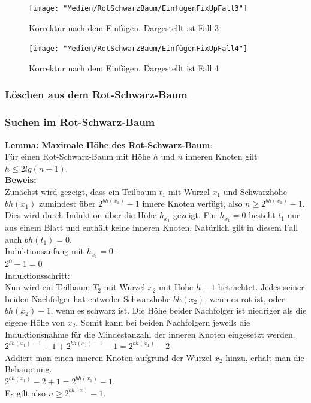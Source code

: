 \documentclass[a4paper,12pt]{article}
\begin{document}
\begin{figure}[h]
	\centering
	\texttt{[image: "Medien/RotSchwarzBaum/EinfügenFixUpFall3"]}
	\caption{Korrektur nach dem Einfügen. Dargestellt ist Fall 3  }
	\label{fig:EinfügenFixUpFall3}
\end{figure}

\begin{figure}[h]
	\centering
	\texttt{[image: "Medien/RotSchwarzBaum/EinfügenFixUpFall4"]}
	\caption{Korrektur nach dem Einfügen. Dargestellt ist Fall 4  }
	\label{fig:EinfügenFixUpFall4}
\end{figure}


   
\subsubsection{Löschen aus dem Rot-Schwarz-Baum}

\subsubsection{Suchen im Rot-Schwarz-Baum}


\noindent\textbf{Lemma: Maximale Höhe des Rot-Schwarz-Baum}:\\
Für einen Rot-Schwarz-Baum mit Höhe $h$ und $n$ inneren Knoten gilt $h \leq  2 lg(n + 1)$. \\
\noindent\textbf{Beweis:}\\
Zunächst wird gezeigt, dass ein Teilbaum $t_1$ mit Wurzel $x_1$ und Schwarzhöhe $\mathit{bh(x_1)}$ zumindest über $2^{bh(x_1)} - 1$ innere Knoten verfügt, also $n \geq 2^{bh(x_1)} - 1 $. Dies wird durch Induktion über die Höhe $\mathit{h_{x_1}}$ gezeigt. Für $\mathit{h_{x_1}} = 0$ besteht $t_1$ nur aus einem Blatt und enthält keine inneren Knoten. Natürlich gilt in diesem Fall auch $\mathit{bh(t_1) = 0}$.  \\
Induktionsanfang mit $\mathit{h_{x_1} = 0}$ :\\
$2^{0} - 1 = 0$\\
Induktionsschritt:\\
Nun wird ein Teilbaum $T_2$ mit Wurzel $x_2$ mit Höhe $h + 1$ betrachtet. Jedes seiner beiden Nachfolger hat entweder Schwarzhöhe  $\mathit{bh(x_2)}$, wenn es rot ist, oder $\mathit{bh(x_2) - 1}$, wenn es schwarz ist. Die Höhe beider Nachfolger ist niedriger als die eigene Höhe von $x_2$. Somit kann bei beiden Nachfolgern jeweils die Induktionsnahme für die Mindestanzahl der inneren Knoten eingesetzt werden.   \\
$2^{bh(x_1)-1} - 1 + 2^{bh(x_1)-1} - 1  = 2^{bh(x_1)} - 2 $ \\
Addiert man einen inneren Knoten aufgrund der Wurzel $x_2$ hinzu, erhält man die Behauptung.\\
$2^{bh(x_1)} - 2 + 1 = 2^{bh(x_1)} - 1 $.\\
Es gilt also $n \geq 2^{\mathit{bh(x)}} - 1$.
\end{document}
